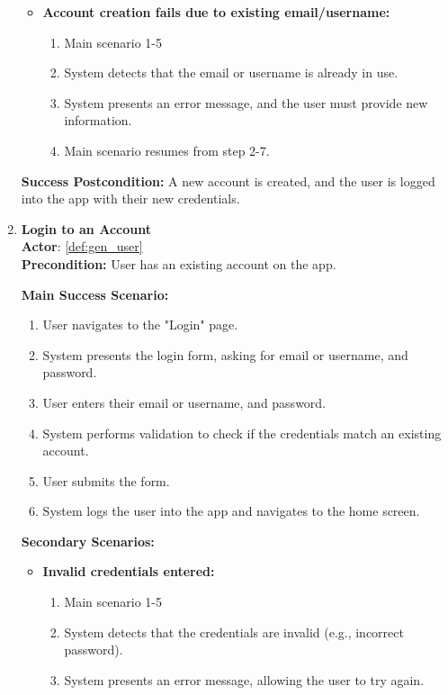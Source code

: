 \documentclass{article}
\begin{document}
\begin{enumerate}[label=\textbf{UC\arabic*}]
\begin{itemize}
              \item[{}] \textbf{Account creation fails due to existing email/username:}
                    \begin{enumerate}[label=\textbf{\arabic*.}]
                        \item Main scenario 1-5
                        \item System detects that the email or username is already in use.
                        \item System presents an error message, and the user must provide new information.
                        \item Main scenario resumes from step 2-7.
                    \end{enumerate}
          \end{itemize}

          \textbf{Success Postcondition:} A new account is created, and the user is logged into the app with their new credentials.

    \item \label{uc:24} \textbf{Login to an Account} \\
          \textbf{Actor}: \ref{def:gen_user} \\
          \textbf{Precondition:} User has an existing account on the app.

          \textbf{Main Success Scenario:}
          \begin{enumerate}[label=\textbf{\arabic*.}]
              \item User navigates to the "Login" page.
              \item System presents the login form, asking for email or username, and password.
              \item User enters their email or username, and password.
              \item System performs validation to check if the credentials match an existing account.
              \item User submits the form.
              \item System logs the user into the app and navigates to the home screen.
          \end{enumerate}

          \textbf{Secondary Scenarios:}
          \begin{itemize}
              \item[{}] \textbf{Invalid credentials entered:}
                    \begin{enumerate}[label=\textbf{\arabic*.}]
                        \item Main scenario 1-5
                        \item System detects that the credentials are invalid (e.g., incorrect password).
                        \item System presents an error message, allowing the user to try again.
                    \end{enumerate}


\end{itemize}
\end{enumerate}
\end{document}
